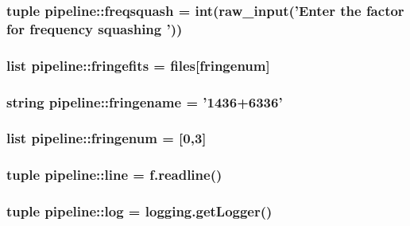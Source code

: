 \hypertarget{namespacepipeline_aba50186d512bf0abac666d6240112f06}{
\subsubsection[{freqsquash}]{\setlength{\rightskip}{0pt plus 5cm}tuple {\bf pipeline\-::freqsquash} = int(raw\-\_\-input('\-Enter the factor for frequency squashing '))}}\label{namespacepipeline_aba50186d512bf0abac666d6240112f06}
\hypertarget{namespacepipeline_a3621af01b0571f7eff023145c99b3401}{
\subsubsection[{fringefits}]{\setlength{\rightskip}{0pt plus 5cm}list {\bf pipeline\-::fringefits} = {\bf files}\mbox{[}{\bf fringenum}\mbox{]}}}\label{namespacepipeline_a3621af01b0571f7eff023145c99b3401}
\hypertarget{namespacepipeline_a3bae9a2cdf4fba11dac330b8005310a4}{
\subsubsection[{fringename}]{\setlength{\rightskip}{0pt plus 5cm}string {\bf pipeline\-::fringename} = '1436+6336'}}\label{namespacepipeline_a3bae9a2cdf4fba11dac330b8005310a4}
\hypertarget{namespacepipeline_a6f2fb1d3250f1f8b6bd4535247b8a9a7}{
\subsubsection[{fringenum}]{\setlength{\rightskip}{0pt plus 5cm}list {\bf pipeline\-::fringenum} = \mbox{[}0,3\mbox{]}}}\label{namespacepipeline_a6f2fb1d3250f1f8b6bd4535247b8a9a7}
\hypertarget{namespacepipeline_a4082c06691225d68a0ad3c6c56e73418}{
\subsubsection[{line}]{\setlength{\rightskip}{0pt plus 5cm}tuple {\bf pipeline\-::line} = f.\-readline()}}\label{namespacepipeline_a4082c06691225d68a0ad3c6c56e73418}
\hypertarget{namespacepipeline_a82223a54352d8bd68ff34cec174a4c48}{
\subsubsection[{log}]{\setlength{\rightskip}{0pt plus 5cm}tuple {\bf pipeline\-::log} = logging.\-get\-Logger()}}\label{namespacepipeline_a82223a54352d8bd68ff34cec174a4c48}

